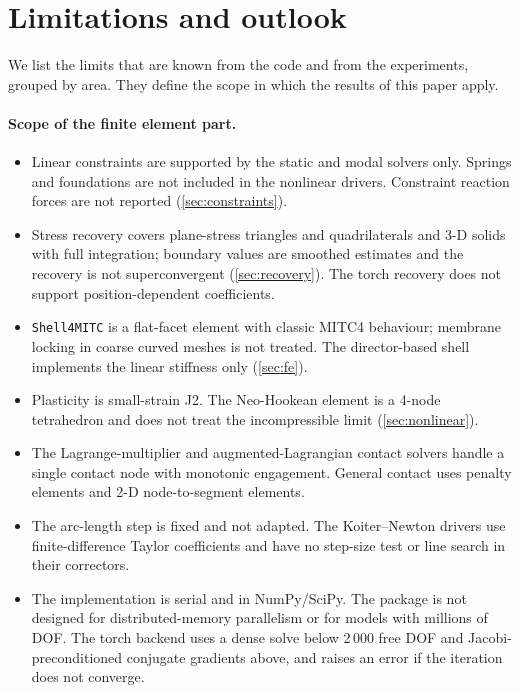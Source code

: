 \section{Limitations and outlook}\label{sec:limits}

We list the limits that are known from the code and from the experiments, grouped by area. They define the scope in which the results of this paper apply.

\paragraph{Scope of the finite element part.}
\begin{itemize}[leftmargin=*,itemsep=2pt]
  \item Linear constraints are supported by the static and modal solvers only. Springs and foundations are not included in the nonlinear drivers. Constraint reaction forces are not reported (\cref{sec:constraints}).
  \item Stress recovery covers plane-stress triangles and quadrilaterals and 3-D solids with full integration; boundary values are smoothed estimates and the recovery is not superconvergent (\cref{sec:recovery}). The torch recovery does not support position-dependent coefficients.
  \item \texttt{Shell4MITC} is a flat-facet element with classic MITC4 behaviour; membrane locking in coarse curved meshes is not treated. The director-based shell implements the linear stiffness only (\cref{sec:fe}).
  \item Plasticity is small-strain J2. The Neo-Hookean element is a 4-node tetrahedron and does not treat the incompressible limit (\cref{sec:nonlinear}).
  \item The Lagrange-multiplier and augmented-Lagrangian contact solvers handle a single contact node with monotonic engagement. General contact uses penalty elements and 2-D node-to-segment elements.
  \item The arc-length step is fixed and not adapted. The Koiter--Newton drivers use finite-difference Taylor coefficients and have no step-size test or line search in their correctors.
  \item The implementation is serial and in NumPy/SciPy. The package is not designed for distributed-memory parallelism or for models with millions of DOF. The torch backend uses a dense solve below 2\,000 free DOF and Jacobi-preconditioned conjugate gradients above, and raises an error if the iteration does not converge.
\end{itemize}

